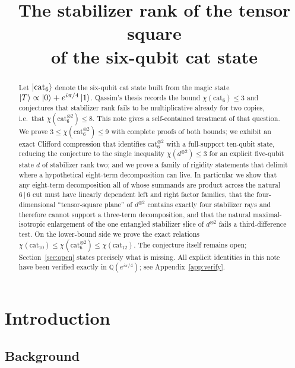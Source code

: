 \documentclass[11pt]{article}
\title{\bfseries The stabilizer rank of the tensor square\\ of the six-qubit cat state}
\author{}
\date{}
\theoremstyle{plain}
\theoremstyle{definition}
\newcommand{\cat}{\mathrm{cat}}
\begin{document}
\maketitle

\begin{abstract}
Let $\ket{\cat_6}$ denote the six-qubit cat state built from the magic state
$\ket{T}\propto\ket{0}+e^{i\pi/4}\ket{1}$. Qassim's thesis records the bound
$\chi(\cat_6)\le 3$ and conjectures that stabilizer rank fails to be multiplicative
already for two copies, i.e.\ that $\chi(\cat_6^{\otimes2})\le 8$. This note gives a
self-contained treatment of that question. We prove
$3\le\chi(\cat_6^{\otimes2})\le 9$ with complete proofs of both bounds; we exhibit an
exact Clifford compression that identifies $\cat_6^{\otimes 2}$ with a full-support
ten-qubit state, reducing the conjecture to the single inequality
$\chi(d^{\otimes2})\le 3$ for an explicit five-qubit state $d$ of stabilizer rank two;
and we prove a family of rigidity statements that delimit where a hypothetical
eight-term decomposition can live. In particular we show that any eight-term
decomposition all of whose summands are product across the natural $6\,|\,6$ cut must
have linearly dependent left and right factor families, that the four-dimensional
``tensor-square plane'' of $d^{\otimes2}$ contains exactly four stabilizer rays and
therefore cannot support a three-term decomposition, and that the natural
maximal-isotropic enlargement of the one entangled stabilizer slice of $d^{\otimes2}$
fails a third-difference test. On the lower-bound side we prove the exact relations
$\chi(\cat_{10})\le\chi(\cat_6^{\otimes2})\le\chi(\cat_{12})$. The conjecture itself
remains open; Section~\ref{sec:open} states precisely what is missing.
All explicit identities in this note have been verified exactly in
$\mathbb{Q}(e^{i\pi/4})$; see Appendix~\ref{app:verify}.
\end{abstract}

\tableofcontents

\section{Introduction}

\subsection{Background}
\end{document}
